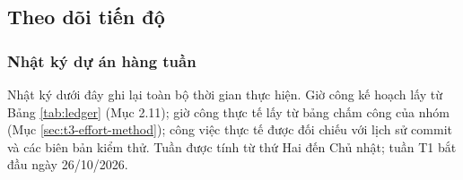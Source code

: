 \subsection{Theo dõi tiến độ}
\label{sec:t3-progress}

\subsubsection{Nhật ký dự án hàng tuần}
\label{sec:t3-weekly}

Nhật ký dưới đây ghi lại toàn bộ thời gian thực hiện. Giờ công kế hoạch lấy từ Bảng \ref{tab:ledger} (Mục 2.11); giờ công thực tế lấy từ bảng chấm công của nhóm (Mục \ref{sec:t3-effort-method}); công việc thực tế được đối chiếu với lịch sử commit và các biên bản kiểm thử. Tuần được tính từ thứ Hai đến Chủ nhật; tuần T1 bắt đầu ngày 26/10/2026.

